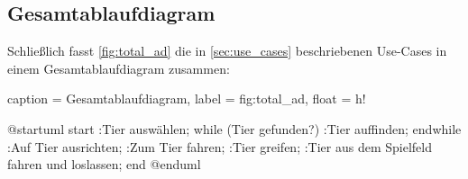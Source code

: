\subsection{Gesamtablaufdiagram}

Schließlich fasst \autoref{fig:total_ad} die in \autoref{sec:use_cases} beschriebenen Use-Cases in einem Gesamtablaufdiagram zusammen:

\begin{dhbwfigure}{%
    caption	= Gesamtablaufdiagram,
    label	= fig:total_ad,
    float   = h!
}

\begin{plantuml}
    @startuml
    start
    :Tier auswählen;
    while (Tier gefunden?)
        :Tier auffinden;
    endwhile
    :Auf Tier ausrichten;
    :Zum Tier fahren;
    :Tier greifen;
    :Tier aus dem Spielfeld fahren und loslassen;
    end
    @enduml
\end{plantuml}
    
\end{dhbwfigure}